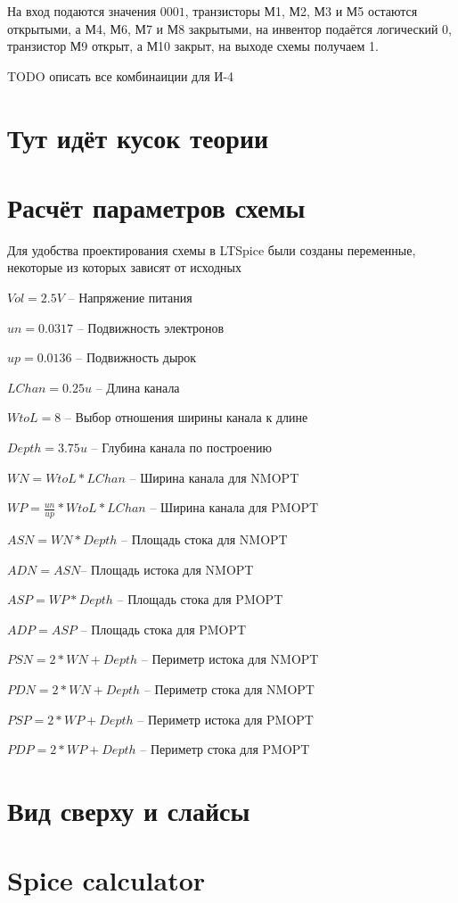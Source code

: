 \documentclass[a4paper,14pt]{article}
\begin{document}
На вход подаются значения $0001$, транзисторы М1, М2, М3 и М5 остаются открытыми, а М4, М6, М7 и М8	 закрытыми, на инвентор подаётся логический 0, транзистор М9 открыт, а М10 закрыт, на выходе схемы получаем 1.

TODO описать все комбинаиции для И-4
\section{Тут идёт кусок теории}

\section{Расчёт параметров схемы}

Для удобства проектирования схемы в LTSpice были созданы переменные, некоторые из которых зависят от исходных

$ Vol = 2.5V  $ -- Напряжение питания

$ un = 0.0317 $ -- Подвижность электронов

$ up = 0.0136 $ -- Подвижность дырок

$ LChan=0.25u $ -- Длина канала

$ WtoL=8 $ -- Выбор отношения ширины канала к длине

$ Depth=3.75u $ -- Глубина канала по построению

$ WN=WtoL * LChan $ -- Ширина канала для NMOPT

$ WP= \frac{un}{up} * WtoL* LChan $ -- Ширина канала для PMOPT

$ ASN=WN * Depth $ -- Площадь стока для NMOPT

$ ADN= ASN $-- Площадь истока для NMOPT

$ ASP=WP * Depth$ -- Площадь стока для PMOPT

$ ADP=ASP $ -- Площадь стока для PMOPT

$ PSN=2 * WN + Depth $ -- Периметр истока для NMOPT

$ PDN=2 * WN + Depth $ -- Периметр стока для NMOPT

$ PSP=2 * WP + Depth $ -- Периметр истока для PMOPT

$ PDP=2 * WP + Depth $ -- Периметр стока для PMOPT


\section{Вид сверху и слайсы}

\section{Spice calculator}
\end{document}

